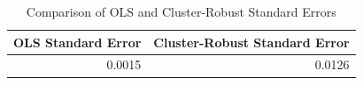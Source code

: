\begin{table}[ht]
\centering
\begin{tabular}{rr}
  \hline
OLS Standard Error & Cluster-Robust Standard Error \\ 
  \hline
0.0015 & 0.0126 \\ 
   \hline
\end{tabular}
\caption{Comparison of OLS and Cluster-Robust Standard Errors} 
\label{tab:se_comparison_d}
\end{table}
